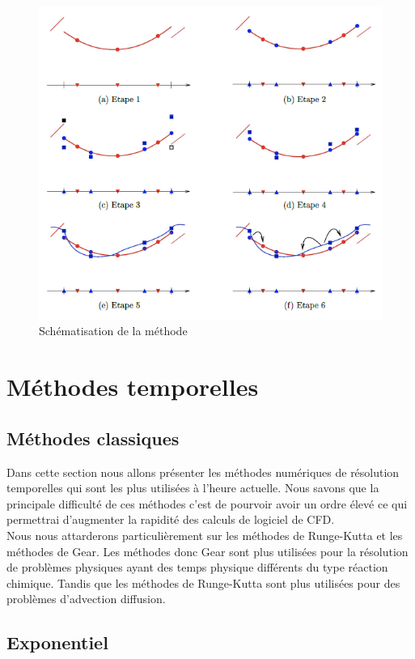 \documentclass[a4paper,12pt]{report}
\theoremstyle{break}
\begin{document}
\begin{figure}[h]
\centering
   \includegraphics[scale=0.5]{images/Meth_spectrale.png}
  	\caption{Schématisation de la méthode} 
   \label{fig:meth_spectrale}
\end{figure}


\chapter{Méthodes temporelles}
\section{Méthodes classiques}

Dans cette section nous allons présenter les méthodes numériques de résolution temporelles qui sont les plus utilisées à l'heure actuelle. Nous savons que la principale difficulté de ces méthodes c'est de pourvoir avoir un ordre élevé ce qui permettrai d'augmenter la rapidité des calculs de logiciel de CFD. \\ 
Nous nous attarderons particulièrement sur les méthodes de Runge-Kutta et les méthodes de Gear. 
Les méthodes donc Gear sont plus utilisées pour la résolution de problèmes physiques ayant des temps physique différents du type réaction chimique. Tandis que les méthodes de Runge-Kutta sont plus utilisées pour des problèmes d'advection diffusion. 

\section{Exponentiel}
\end{document}
